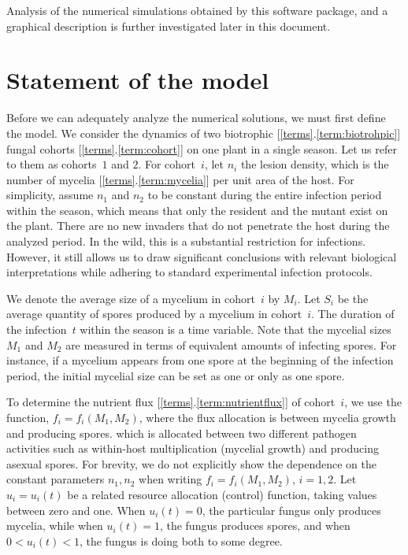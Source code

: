 \documentclass[11pt]{amsart}
\begin{document}
Analysis of the numerical simulations obtained by this software package, and a graphical description is further investigated later in this document.


\section{Statement of the model}
Before we can adequately analyze the numerical solutions, we must first define the model. We consider the dynamics of two biotrophic [\ref{terms}.\ref{term:biotrohpic}] fungal cohorts [\ref{terms}.\ref{term:cohort}] on one plant in a single season.  Let us refer to them as cohorts~$ 1 $ and $ 2 $. For
cohort~$ i $, let $ n_i $ the lesion density, which is the number of mycelia [\ref{terms}.\ref{term:mycelia}]
per unit area of the host. For simplicity, assume $ n_1 $ and $ n_2 $ to be
constant during the entire infection period within the season, which means that
only the resident and the mutant exist on the plant. There are no new invaders that do not penetrate the host during the analyzed period.
In the wild, this is a substantial restriction for infections. However, it still allows us to draw significant conclusions with relevant
biological interpretations while adhering to standard experimental infection protocols.

We denote the average size of a mycelium in cohort~$ i $ by $ M_i $. Let $ S_i $
be the average quantity of spores produced by a mycelium in cohort~$ i $. The duration of the
infection~$ t $ within the season is a time variable. Note that the
mycelial sizes~$ M_1 $ and $ M_2 $ are measured in terms of equivalent amounts
of infecting spores. For instance, if a mycelium appears from one spore at the
beginning of the infection period, the initial mycelial size can be set as one or only as one spore.

To determine the nutrient flux [\ref{terms}.\ref{term:nutrientflux}]
of cohort~$ i $, we use the function,
$ f_i = f_i(M_1, M_2) $, where the flux allocation is between mycelia growth and producing spores. which is allocated between two different pathogen
activities such as within-host multiplication (mycelial growth) and producing
asexual spores. For brevity, we do not explicitly show the dependence on the
constant parameters $ n_1, n_2 $ when writing $ f_i = f_i(M_1, M_2) $,
$ i = 1,2 $. Let $ u_i = u_i(t) $ be a related resource allocation (control)
function, taking values between zero and one. 
When $ u_i(t) = 0 $, the particular fungus only produces mycelia, while when $ u_i(t) = 1 $, the fungus produces spores, and when $ 0 < u_i(t) < 1 $, the fungus is doing both to some degree.
\end{document}
